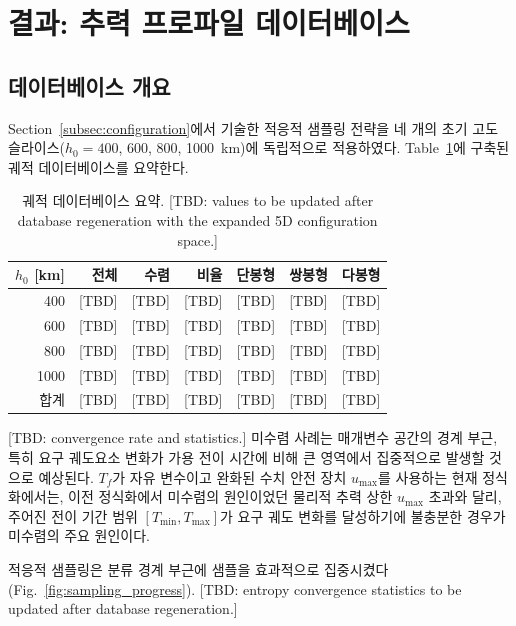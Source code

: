 \documentclass[a4paper,fleqn]{cas-dc}
\let\origsubsection\subsection
\renewcommand{\subsection}{\FloatBarrier\origsubsection}
\begin{document}
\section{결과: 추력 프로파일 데이터베이스}\label{sec:results_database}

\subsection{데이터베이스 개요}\label{subsec:database_overview}

Section~\ref{subsec:configuration}에서 기술한 적응적 샘플링 전략을 네 개의 초기 고도 슬라이스($h_0 = 400$, 600, 800, 1000~km)에 독립적으로 적용하였다. Table~\ref{tab:db_summary}에 구축된 궤적 데이터베이스를 요약한다.

\begin{table}[ht]
\centering
\caption{궤적 데이터베이스 요약. [TBD: values to be updated after database regeneration with the expanded 5D configuration space.]}
\label{tab:db_summary}
\begin{tabular}{rrrrccc}
\hline
$h_0$ [km] & 전체 & 수렴 & 비율 & 단봉형 & 쌍봉형 & 다봉형 \\
\hline
400 & [TBD] & [TBD] & [TBD] & [TBD] & [TBD] & [TBD] \\
600 & [TBD] & [TBD] & [TBD] & [TBD] & [TBD] & [TBD] \\
800 & [TBD] & [TBD] & [TBD] & [TBD] & [TBD] & [TBD] \\
1000 & [TBD] & [TBD] & [TBD] & [TBD] & [TBD] & [TBD] \\
\hline
합계 & [TBD] & [TBD] & [TBD] & [TBD] & [TBD] & [TBD] \\
\hline
\end{tabular}
\end{table}

[TBD: convergence rate and statistics.] 미수렴 사례는 매개변수 공간의 경계 부근, 특히 요구 궤도요소 변화가 가용 전이 시간에 비해 큰 영역에서 집중적으로 발생할 것으로 예상된다. $T_f$가 자유 변수이고 완화된 수치 안전 장치 $u_{\max}$를 사용하는 현재 정식화에서는, 이전 정식화에서 미수렴의 원인이었던 물리적 추력 상한 $u_{\max}$ 초과와 달리, 주어진 전이 기간 범위 $[T_{\min}, T_{\max}]$가 요구 궤도 변화를 달성하기에 불충분한 경우가 미수렴의 주요 원인이다.

적응적 샘플링은 분류 경계 부근에 샘플을 효과적으로 집중시켰다(Fig.~\ref{fig:sampling_progress}). [TBD: entropy convergence statistics to be updated after database regeneration.]
\end{document}
